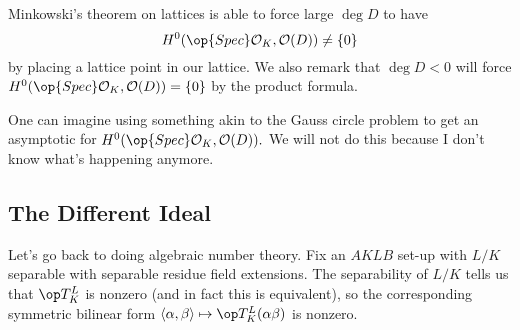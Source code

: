 Minkowski's theorem on lattices is able to force large $\deg D$ to have
\[H^0(\op{Spec}\mathcal O_K,\mathcal O(D))\ne\{0\}\]
by placing a lattice point in our lattice. We also remark that $\deg D<0$ will force $H^0(\op{Spec}\mathcal O_K,\mathcal O(D))=\{0\}$ by the product formula.
\begin{remark}
	One can imagine using something akin to the Gauss circle problem to get an asymptotic for $H^0(\op{Spec}\mathcal O_K,\mathcal O(D)).$ We will not do this because I don't know what's happening anymore.
\end{remark}

\subsection{The Different Ideal}
Let's go back to doing algebraic number theory. Fix an $AKLB$ set-up with $L/K$ separable with separable residue field extensions. The separability of $L/K$ tells us that $\op T^L_K$ is nonzero (and in fact this is equivalent), so the corresponding symmetric bilinear form $\langle\alpha,\beta\rangle\mapsto\op T^L_K(\alpha\beta)$ is nonzero.

